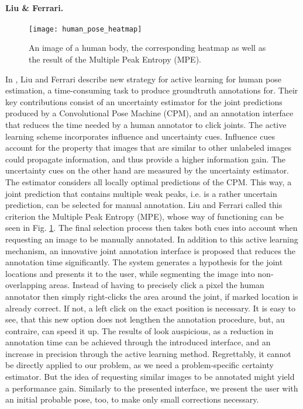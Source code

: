 \paragraph{Liu \& Ferrari.}

\begin{figure}[!tbp]
	\centering
    \texttt{[image: human\_pose\_heatmap]}
    \caption{An image of a human body, the corresponding heatmap as well as the result of the Multiple Peak Entropy (MPE). \cite{humanpose}}
    \label{fig:humanpose}
\end{figure}
In \cite{humanpose}, Liu and Ferrari describe new strategy for active learning for human pose estimation, a time-consuming task to produce groundtruth annotations for. Their key contributions consist of an uncertainty estimator for the joint predictions produced by a Convolutional Pose Machine (CPM), and an annotation interface that reduces the time needed by a human annotator to click joints.
\nnewline
The active learning scheme incorporates influence and uncertainty cues. Influence cues account for the property that images that are similar to other unlabeled images could propagate information, and thus provide a higher information gain. The uncertainty cues on the other hand are measured by the uncertainty estimator. The estimator considers all locally optimal predictions of the CPM. This way, a joint prediction that contains multiple weak peaks, i.e. is a rather uncertain prediction, can be selected for manual annotation. Liu and Ferrari called this criterion the Multiple Peak Entropy (MPE), whose way of functioning can be seen in Fig. \ref{fig:humanpose}. The final selection process then takes both cues into account when requesting an image to be manually annotated.
\nnewline
In addition to this active learning mechanism, an innovative joint annotation interface is proposed that reduces the annotation time significantly. The system generates a hypothesis for the joint locations and presents it to the user, while segmenting the image into non-overlapping areas. Instead of having to precisely click a pixel the human annotator then simply right-clicks the area around the joint, if marked location is already correct. If not, a left click on the exact position is necessary. It is easy to see, that this new option does not lengthen the annotation procedure, but, au contraire, can speed it up.
\nnewline
The results of \cite{humanpose} look auspicious, as a reduction in annotation time can be achieved through the introduced interface, and an increase in precision through the active learning method. Regrettably, it cannot be directly applied to our problem, as we need a problem-specific certainty estimator. But the idea of requesting similar images to be annotated might yield a performance gain. Similarly to the presented interface, we present the user with an initial probable pose, too, to make only small corrections necessary.
